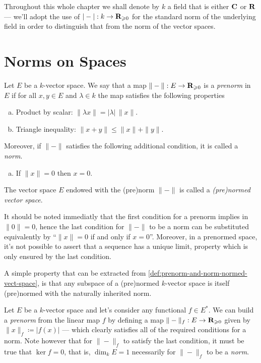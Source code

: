 \begin{remark}
\label{rem:k-is-C-or-R}
Throughout this whole chapter we shall denote by \(k\) a field that is either
\(\mathbf{C}\) or \(\mathbf{R}\) --- we'll adopt the use of \(|-|: k \to \mathbf{R}_{\geqslant 0}\) for the
standard norm of the underlying field in order to distinguish that from the norm
of the vector spaces.
\end{remark}

\section{Norms on Spaces}

\begin{definition}
\label{def:prenorm-and-norm-normed-vect-space}
Let \(E\) be a \(k\)-vector space. We say that a map \(\|-\|: E \to
\mathbf{R}_{\geqslant 0}\) is a \emph{prenorm} in \(E\) if for all \(x, y \in E\) and
\(\lambda \in k\) the map satisfies the following properties
\begin{enumerate}[(a)]\setlength\itemsep{0em}
\item Product by scalar: \(\|\lambda x\| = |\lambda|\, \|x\|\).
\item Triangle inequality: \(\| x + y \| \leq \| x \| + \| y \|\).
\end{enumerate}
Moreover, if \(\| - \|\) satisfies the following additional condition, it is
called a \emph{norm}.
\begin{enumerate}[(a)]\setlength\itemsep{0em}\setcounter{enumi}{2}
\item If \(\| x \| = 0\) then \(x = 0\).
\end{enumerate}
The vector space \(E\) endowed with the (pre)norm \(\| - \|\) is called a
\emph{(pre)normed vector space}.
\end{definition}

It should be noted immediatly that the first condition for a prenorm implies in
\(\| 0 \| = 0\), hence the last condition for \(\| - \|\) to be a norm can be
substituted equivalently by ``\(\| x \| = 0\) if and only if \(x =
0\)''. Moreover, in a prenormed space, it's not possible to assert that a
sequence has a unique limit, property which is only ensured by the last
condition.

A simple property that can be extracted from
\cref{def:prenorm-and-norm-normed-vect-space}, is that any subspace of a
(pre)normed \(k\)-vector space is itself (pre)normed with the naturally
inherited norm.

\begin{example}
\label{exp:norm-from-functional}
Let \(E\) be a \(k\)-vector space and let's consider any functional \(f \in
E^{*}\). We can build a \emph{prenorm} from the linear map \(f\) by defining a
map \(\| - \|_f: E \to \mathbf{R}_{\geqslant 0}\) given by \(\| x \|_f \coloneq |f(x)|\) ---
which clearly satisfies all of the required conditions for a norm. Note however
that for \(\| - \|_f\) to satisfy the last condition, it must be true that
\(\ker f = 0\), that is, \(\dim_{k} E = 1\) necessarily for \(\| - \|_f\) to be
a \emph{norm}.
\end{example}

